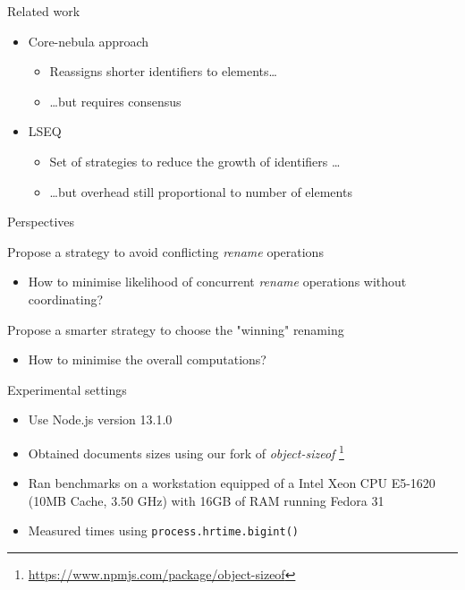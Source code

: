 \documentclass[10pt]{beamer}
\begin{document}
\begin{frame}{Related work}
  \begin{itemize}
    \item Core-nebula approach 
    \begin{itemize}
      \item Reassigns shorter identifiers to elements\dots
      \item \dots but requires consensus
    \end{itemize}
    \item LSEQ 
    \begin{itemize}
      \item Set of strategies to reduce the growth of identifiers \dots
      \item \dots but overhead still proportional to number of elements
    \end{itemize}
  \end{itemize}
\end{frame}

\begin{frame}{Perspectives}
  \begin{block}{Propose a strategy to avoid conflicting \emph{rename} operations}
    \begin{itemize}
      \item How to minimise likelihood of concurrent \emph{rename} operations without coordinating?
    \end{itemize}
  \end{block}

  \begin{block}{Propose a smarter strategy to choose the "winning" renaming}
    \begin{itemize}
      \item How to minimise the overall computations?
    \end{itemize}
  \end{block}
\end{frame}

\begin{frame}{Experimental settings}
  \begin{itemize}
    \item Use Node.js version 13.1.0
    \item Obtained documents sizes using our fork of \emph{object-sizeof} \footnote{\url{https://www.npmjs.com/package/object-sizeof}}
    \item Ran benchmarks on a workstation equipped of a Intel Xeon CPU E5-1620 (10MB Cache, 3.50 GHz) with 16GB of RAM running Fedora 31
    \item Measured times using \texttt{process.hrtime.bigint()}
  \end{itemize}
\end{frame}
\end{document}
